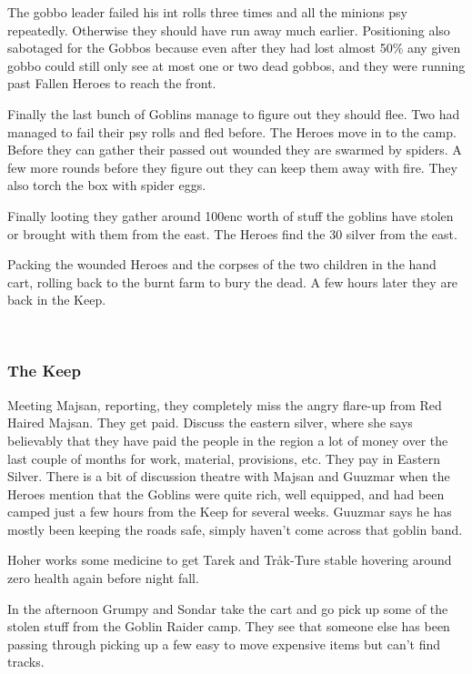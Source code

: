 \begin{readoutloud}
The gobbo leader failed his int rolls three times and all the minions psy repeatedly. Otherwise they should have run away much earlier. Positioning also sabotaged for the Gobbos because even after they had lost almost 50\% any given gobbo could still only see at most one or two dead gobbos, and they were running past Fallen Heroes to reach the front.
\end{readoutloud}

Finally the last bunch of Goblins manage to figure out they should flee. Two had managed to fail their psy rolls and fled before. The Heroes move in to the camp. Before they can gather their passed out wounded they are swarmed by spiders. A few more rounds before they figure out they can keep them away with fire. They also torch the box with spider eggs.

Finally looting they gather around 100enc worth of stuff the goblins have stolen or brought with them from the east. The Heroes find the 30 silver from the east.

Packing the wounded Heroes and the corpses of the two children in the hand cart, rolling back to the burnt farm to bury the dead. A few hours later they are back in the Keep.

\

\subsubsection*{The Keep}
Meeting Majsan, reporting, they completely miss the angry flare-up from Red Haired Majsan. They get paid. Discuss the eastern silver, where she says believably that they have paid the people in the region a lot of money over the last couple of months for work, material, provisions, etc. They pay in Eastern Silver. There is a bit of discussion theatre with Majsan and Guuzmar when the Heroes mention that the Goblins were quite rich, well equipped, and had been camped just a few hours from the Keep for several weeks. Guuzmar says he has mostly been keeping the roads safe, simply haven't come across that goblin band.

Hoher works some medicine to get Tarek and Tråk-Ture stable hovering around zero health again before night fall.

In the afternoon Grumpy and Sondar take the cart and go pick up some of the stolen stuff from the Goblin Raider camp. They see that someone else has been passing through picking up a few easy to move expensive items but can't find tracks.

